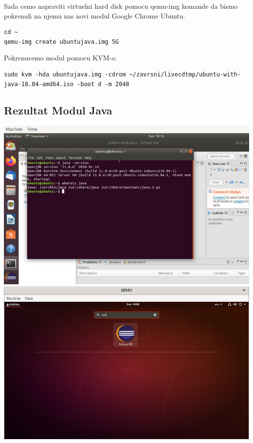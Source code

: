 \documentclass[12pt,vi]{mitthesis}
\begin{document}
\noindent
Sada cemo napraviti virtuelni hard disk pomocu qemu-img komande da bismo pokrenuli na njemu nas novi modul Google Chrome Ubuntu.
\begin{lstlisting}[style=BashInputStyle]
cd ~
qemu-img create ubuntujava.img 5G
\end{lstlisting}

\noindent 
Pokrenucemo modul pomocu KVM-a:
\begin{lstlisting}[style=BashInputStyle]
sudo kvm -hda ubuntujava.img -cdrom ~/zavrsni/livecdtmp/ubuntu-with-java-18.04-amd64.iso -boot d -m 2048
\end{lstlisting}

\subsection*{Rezultat Modul Java}
\includegraphics[width=\linewidth]{images/javaLive.png} 
\includegraphics[width=\linewidth]{images/eclipseLive.png} 
\end{document}
